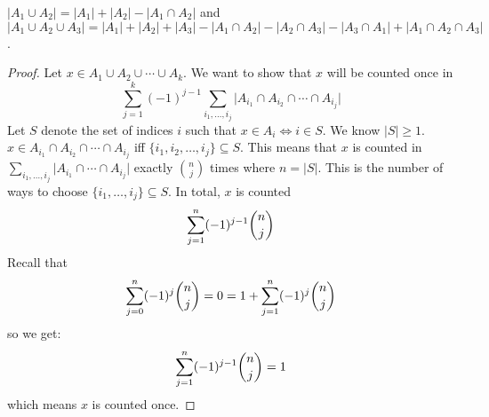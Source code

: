 \documentclass{report}
\begin{document}
\begin{examples}
    \begin{example}
        $\lvert A_{1} \cup A_{2} \rvert = \lvert A_{1} \rvert + \lvert A_{2} \rvert - \lvert A_{1} \cap A_{2} \rvert$ and $\lvert A_{1} \cup A_{2} \cup A_{3} \rvert = \lvert A_{1} \rvert + \lvert A_{2} \rvert + \lvert A_{3} \rvert - \lvert A_{1} \cap A_{2} \rvert - \lvert A_{2} \cap A_{3} \rvert - \lvert A_{3} \cap A_{1} \rvert + \lvert A_{1} \cap A_{2} \cap A_{3} \rvert$.
    \end{example}
\end{examples}
    \begin{proof}
        Let $x \in A_{1} \cup A_{2} \cup \cdots \cup A_{k}$. We want to show that $x$ will be counted once in 
            \begin{equation*}
                \sum_{j = 1}^{k} (-1)^{j - 1}\sum_{i_{1}, \ldots , i_{j}}^{} \lvert A_{i_{1}} \cap A_{i_{2}} \cap \cdots \cap A_{i_{j}} \rvert
            \end{equation*}
        Let $S$ denote the set of indices $i$ such that $x \in A_{i} \iff i \in S$. We know $\lvert S \rvert \geq 1$. $x \in A_{i_{1}} \cap A_{i_{2}} \cap \cdots \cap A_{i_{j}}$ iff $\{i_{1}, i_{2}, \ldots , i_{j}\} \subseteq S$. This means that $x$ is counted in $\sum_{i_{1}, \ldots , i_{j}}^{}  \lvert A_{i_{1}} \cap \cdots \cap A_{i_{j}} \rvert$ exactly $\binom{n}{j}$ times where $n = \lvert S \rvert$. This is the number of ways to choose $\{i_{1}, \ldots , i_{j}\}\subseteq S$. In total, $x$ is counted 
            \begin{equation*}
                \sum_{j = 1}^{n} (-1)^{j - 1} \dbinom{n}{j}
            \end{equation*}
        Recall that 
            \begin{equation*}
                \sum_{j = 0}^{n} (-1)^{j}\dbinom{n}{j} = 0 = 1 + \sum_{j = 1}^{n} (-1)^{j}\dbinom{n}{j}
            \end{equation*}
        so we get:
            \begin{equation*}
                \sum_{j = 1}^{n} (-1)^{j - 1}\dbinom{n}{j} = 1
            \end{equation*}
        which means $x$ is counted once.
    \end{proof}
\end{document}
